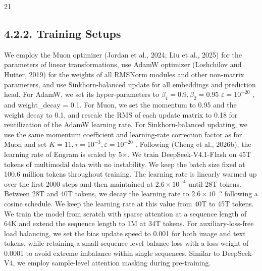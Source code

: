 \documentclass[
  10
]{article}
\begin{document}
21

\subsection{4.2.2. Training Setups}\label{training-setups}

We employ the Muon optimizer (Jordan et al., 2024; Liu et al., 2025) for
the parameters of linear transformations, use AdamW optimizer
(Loshchilov and Hutter, 2019) for the weights of all RMSNorm modules and
other non-matrix parameters, and use Sinkhorn-balanced update for all
embeddings and prediction head. For AdamW, we set its hyper-parameters
to \(\beta _ { 1 } = 0 . 9 , \beta _ { 2 } = 0 . 9 5\)
\(\varepsilon = 1 0 ^ { - 2 0 }\) , and weight\_decay = 0.1. For Muon,
we set the momentum to 0.95 and the weight decay to 0.1, and rescale the
RMS of each update matrix to 0.18 for reutilization of the AdamW
learning rate. For Sinkhorn-balanced updating, we use the same momentum
coefficient and learning-rate correction factor as for Muon and set
\(K = 1 1 , \tau = 1 0 ^ { - 3 } , \varepsilon = 1 0 ^ { - 2 0 }\) .
Following (Cheng et al., 2026b), the learning rate of Engram is scaled
by 5$\times$. We train DeepSeek-V4.1-Flash on 45T tokens of multimodal data
with no instability. We keep the batch size fixed at 100.6 million
tokens throughout training. The learning rate is linearly warmed up over
the first 2000 steps and then maintained at
\(2 . 6 \times 1 0 ^ { - 4 }\) until 28T tokens. Between 28T and 40T
tokens, we decay the learning rate to \(2 . 6 \times 1 0 ^ { - 5 }\)
following a cosine schedule. We keep the learning rate at this value
from 40T to 45T tokens. We train the model from scratch with sparse
attention at a sequence length of 64K and extend the sequence length to
1M at 34T tokens. For auxiliary-loss-free load balancing, we set the
bias update speed to 0.001 for both image and text tokens, while
retaining a small sequence-level balance loss with a loss weight of
0.0001 to avoid extreme imbalance within single sequences. Similar to
DeepSeek-V4, we employ sample-level attention masking during
pre-training.
\end{document}
